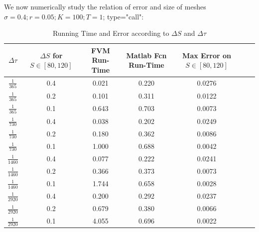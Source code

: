 \documentclass[final]{siamltex}
\begin{document}
We now numerically study the relation of error and size of meshes $\sigma = 0.4;
r = 0.05;
K = 100;
T = 1$; type="call": 
\begin{table}[h!]
	\centering
	{\small
		\begin{tabular}{|c|c|c|c|c|c|c|}
			
			\hline
			
			$\Delta \tau$ &$\Delta S$ for $S \in [80,120]$&FVM Run-Time &Matlab Fcn Run-Time &Max Error on $S\in[80,120]$\\
			
			\hline
			
			$\frac{1}{365}$&0.4&0.021&0.220&0.0276\\
			
			$\frac{1}{365}$&0.2&0.101&0.311&0.0122\\
			
			$\frac{1}{365}$&0.1&0.643&0.703&0.0073\\
			
			\hline
			
			$\frac{1}{730}$&0.4&0.038&0.202&0.0249\\
			
			$\frac{1}{730}$&0.2&0.180&0.362&0.0086\\
			
			$\frac{1}{730}$&0.1&1.000&0.688&0.0042\\
			
			\hline
			
			$\frac{1}{1460}$&0.4&0.077&0.222&0.0241\\
			
			$\frac{1}{1460}$&0.2&0.366&0.373&0.0073\\
			
			$\frac{1}{1460}$&0.1&1.744&0.658&0.0028\\
			
			\hline
			
			
			$\frac{1}{2920}$&0.4&0.200&0.292&0.0237\\
			
			$\frac{1}{2920}$&0.2&0.679&0.380&0.0066\\
			
			$\frac{1}{2920}$&0.1&4.055&0.696&0.0022\\
			
			\hline
			
		\end{tabular}
	}
	
	\caption{Running Time and Error according to $\Delta S$ and $\Delta \tau$}
	\label{tearingunif}
\end{table}
\end{document}
